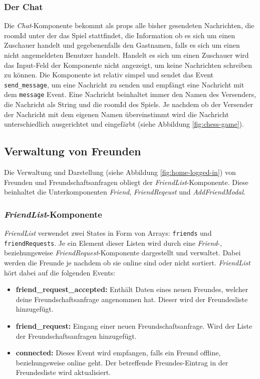 \subsubsection{Der Chat}
Die \textit{Chat}-Komponente bekommt als props alle bisher gesendeten Nachrichten, die roomId unter der das Spiel stattfindet, die Information ob es sich um einen Zuschauer handelt und gegebenenfalls den Gastnamen, falls es sich um einen nicht angemeldeten Benutzer handelt. Handelt es sich um einen Zuschauer wird das Input-Feld der Komponente nicht angezeigt, um keine Nachrichten schreiben zu können. Die Komponente ist relativ simpel und sendet das Event \verb|send_message|, um eine Nachricht zu senden und empfängt eine Nachricht mit dem \verb|message| Event. Eine Nachricht beinhaltet immer den Namen des Versenders, die Nachricht als String und die roomId des Spiels. Je nachdem ob der Versender der Nachricht mit dem eigenen Namen übereinstimmt wird die Nachricht unterschiedlich ausgerichtet und eingefärbt (siehe Abbildung \ref{fig:chess-game}).

\subsection{Verwaltung von Freunden}
\label{sec:Friends}
Die Verwaltung und Darstellung (siehe Abbildung \ref{fig:home-logged-in}) von Freunden und Freundschaftsanfragen obliegt der \textit{FriendList}-Komponente. Diese beinhaltet die Unterkomponenten \textit{Friend}, \textit{FriendReqeust} und \textit{AddFriendModal}.

\subsubsection{\textit{FriendList}-Komponente}
\label{sec:FriendList}
\textit{FriendList} verwendet zwei States in Form von Arrays: \verb|friends| und \verb|friendRequests|. Je ein Element dieser Listen wird durch eine \textit{Friend}-, beziehungsweise \textit{FriendRequest}-Komponente dargestellt und verwaltet. Dabei werden die Freunde je nachdem ob sie online sind oder nicht sortiert. \textit{FriendList} hört dabei auf die folgenden Events: 
\begin{itemize}
\item \textbf{friend\_request\_accepted:} Enthält Daten eines neuen Freundes, welcher deine Freundschaftsanfrage angenommen hat. Dieser wird der Freundesliste hinzugefügt.
\item \textbf{friend\_request:} Eingang einer neuen Freundschaftsanfrage. Wird der Liste der Freundschaftsanfragen hinzugefügt.
\item \textbf{connected:} Dieses Event wird empfangen, falls ein Freund offline, beziehungsweise online geht. Der betreffende Freundes-Eintrag in der Freundesliste wird aktualisiert.
\end{itemize}

